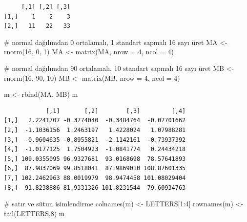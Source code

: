 \documentclass[
  letterpaper,
  DIV=11,
  numbers=noendperiod]{scrreprt}
\newenvironment{Shaded}{\begin{snugshade}}{\end{snugshade}}
\newcommand{\AttributeTok}[1]{\textcolor[rgb]{0.40,0.45,0.13}{#1}}
\newcommand{\CommentTok}[1]{\textcolor[rgb]{0.37,0.37,0.37}{#1}}
\newcommand{\DecValTok}[1]{\textcolor[rgb]{0.68,0.00,0.00}{#1}}
\newcommand{\FunctionTok}[1]{\textcolor[rgb]{0.28,0.35,0.67}{#1}}
\newcommand{\NormalTok}[1]{\textcolor[rgb]{0.00,0.23,0.31}{#1}}
\newcommand{\OtherTok}[1]{\textcolor[rgb]{0.00,0.23,0.31}{#1}}
\newcommand{\SpecialCharTok}[1]{\textcolor[rgb]{0.37,0.37,0.37}{#1}}
\begin{document}
\begin{verbatim}
     [,1] [,2] [,3]
[1,]    1    2    3
[2,]   11   22   33
\end{verbatim}

\begin{Shaded}
\begin{Highlighting}[]
\CommentTok{\# normal dağılımdan 0 ortalamalı, 1 standart sapmalı 16 sayı üret}
\NormalTok{MA }\OtherTok{\textless{}{-}} \FunctionTok{rnorm}\NormalTok{(}\DecValTok{16}\NormalTok{, }\DecValTok{0}\NormalTok{, }\DecValTok{1}\NormalTok{)}
\NormalTok{MA }\OtherTok{\textless{}{-}} \FunctionTok{matrix}\NormalTok{(MA, }\AttributeTok{nrow =} \DecValTok{4}\NormalTok{, }\AttributeTok{ncol =} \DecValTok{4}\NormalTok{)}

\CommentTok{\# normal dağılımdan 90 ortalamalı, 10 standart sapmalı 16 sayı üret}
\NormalTok{MB }\OtherTok{\textless{}{-}} \FunctionTok{rnorm}\NormalTok{(}\DecValTok{16}\NormalTok{, }\DecValTok{90}\NormalTok{, }\DecValTok{10}\NormalTok{)}
\NormalTok{MB }\OtherTok{\textless{}{-}} \FunctionTok{matrix}\NormalTok{(MB, }\AttributeTok{nrow =} \DecValTok{4}\NormalTok{, }\AttributeTok{ncol =} \DecValTok{4}\NormalTok{)}

\NormalTok{m }\OtherTok{\textless{}{-}} \FunctionTok{rbind}\NormalTok{(MA, MB)}
\NormalTok{m}
\end{Highlighting}
\end{Shaded}

\begin{verbatim}
            [,1]       [,2]        [,3]         [,4]
[1,]   2.2241707 -0.3774040  -0.3484764  -0.07701662
[2,]  -1.1036156  1.2463197   1.4228024   1.07988281
[3,]  -0.9604635 -0.8955821  -2.1142161  -0.73937392
[4,]  -1.0177125  1.7504923  -1.0841774   0.24434218
[5,] 109.0355095 96.9327681  93.0168698  78.57641893
[6,]  87.9837069 99.8518041  87.9869010 108.87601335
[7,] 102.2462963 88.0019979  98.9474458 101.08029404
[8,]  91.8238886 81.9331326 101.8231544  79.60934763
\end{verbatim}

\begin{Shaded}
\begin{Highlighting}[]
\CommentTok{\# satır ve sütun isimlendirme}
\FunctionTok{colnames}\NormalTok{(m) }\OtherTok{\textless{}{-}}\NormalTok{ LETTERS[}\DecValTok{1}\SpecialCharTok{:}\DecValTok{4}\NormalTok{]}
\FunctionTok{rownames}\NormalTok{(m) }\OtherTok{\textless{}{-}} \FunctionTok{tail}\NormalTok{(LETTERS,}\DecValTok{8}\NormalTok{)}
\NormalTok{m}
\end{Highlighting}
\end{Shaded}
\end{document}
